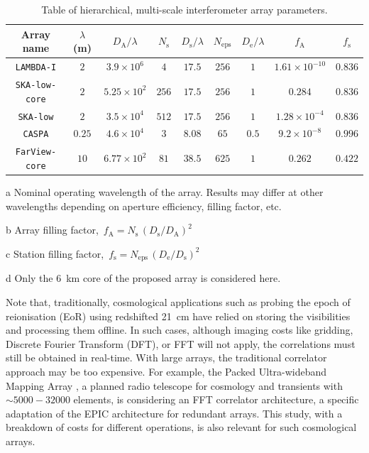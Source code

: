 \documentclass[
  journal=pasa,
  manuscript=article-type,
  year=2020,
  volume=37,
]{cup-journal}
\begin{document}
\begin{table}[htb!]
\normalsize
\begin{threeparttable}
\caption{Table of hierarchical, multi-scale interferometer array parameters.}
\label{tab:array_params}
\begin{tabular}{ccccccc|cc}
\toprule
\headrow Array name & $\lambda$ (m)\tnote{a} & $D_\textrm{A}/\lambda$ & $N_\textrm{s}$ & $D_\textrm{s}/\lambda$ & $N_\textrm{eps}$ & $D_\textrm{e}/\lambda$ & $f_\textrm{A}$\tnote{b} & $f_\textrm{s}$\tnote{c} \\
\midrule
\texttt{LAMBDA-I} & $2$ & $3.9\times 10^6$ & $4$ & $17.5$ & $256$ & $1$ &  $1.61\times 10^{-10}$ & $0.836$ \\ 
\texttt{SKA-low-core} & $2$ & $5.25\times 10^{2}$ & $256$ & $17.5$ & $256$ & $1$ & $0.284$ & $0.836$ \\ 
\texttt{SKA-low} & $2$ & $3.5\times 10^4$ & $512$ & $17.5$ & $256$ & $1$ &  $1.28\times 10^{-4}$ & $0.836$ \\ 
\texttt{CASPA} & $0.25$ & $4.6\times 10^4$ & $3$ & $8.08$ & $65$ & $0.5$ &  $9.2\times 10^{-8}$ & $0.996$ \\ 
\texttt{FarView-core}\tnote{d} & $10$ & $6.77\times 10^2$ & $81$ & $38.5$ & $625$ & $1$ & $0.262$ & $0.422$ \\ 
\bottomrule
\end{tabular}
\begin{tablenotes}[hang]
\item[a]Nominal operating wavelength of the array. Results may differ at other wavelengths depending on aperture efficiency, filling factor, etc. 
\item[b]Array filling factor, $\,f_\textrm{A}=N_\textrm{s}\,(D_\textrm{s}/D_\textrm{A})^2$
\item[c]Station filling factor, $\,f_\textrm{s}=N_\textrm{eps}\,(D_\textrm{e}/D_\textrm{s})^2$
\item[d]Only the 6~km core of the proposed array \citep{Polidan+2024} is considered here.
\end{tablenotes}
\end{threeparttable}
\end{table}

Note that, traditionally, cosmological applications such as probing the epoch of reionisation (EoR) using redshifted 21~cm have relied on storing the visibilities and processing them offline. In such cases, although imaging costs like gridding, Discrete Fourier Transform (DFT), or FFT will not apply, the correlations must still be obtained in real-time. With large arrays, the traditional correlator approach may be too expensive. For example, the Packed Ultra-wideband Mapping Array \citep[PUMA;][]{PUMA+2019}, a planned radio telescope for cosmology and transients with $\sim 5000-32000$ elements, is considering an FFT correlator architecture, a specific adaptation of the EPIC architecture for redundant arrays. This study, with a breakdown of costs for different operations, is also relevant for such cosmological arrays.
\end{document}
